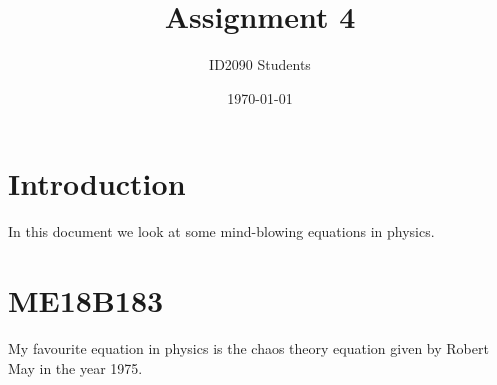 \documentclass[a4paper, 12pt]{article}
\begin{document}
\title{Assignment 4}
\author{ID2090 Students}
\date{\today}
\maketitle

\tableofcontents

\section{Introduction}
In this document we look at some mind-blowing equations in physics.

\section{ME18B183}
My favourite equation in physics is the chaos theory equation given by Robert May in the year 1975.

\end{document}
